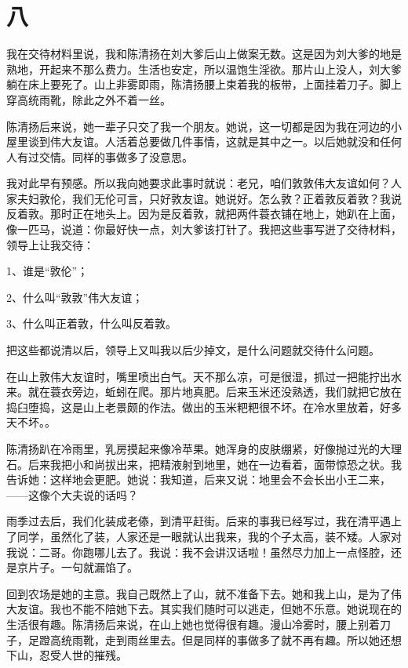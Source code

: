  

\section{八} 
 
我在交待材料里说，我和陈清扬在刘大爹后山上做案无数。这是因为刘大爹的地是熟地，开起来不那么费力。生活也安定，所以温饱生淫欲。那片山上没人，刘大爹躺在床上要死了。山上非雾即雨，陈清扬腰上束着我的板带，上面挂着刀子。脚上穿高统雨靴，除此之外不着一丝。 
 
 陈清扬后来说，她一辈子只交了我一个朋友。她说，这一切都是因为我在河边的小屋里谈到伟大友谊。人活着总要做几件事情，这就是其中之一。以后她就没和任何人有过交情。同样的事做多了没意思。 
 
 我对此早有预感。所以我向她要求此事时就说：老兄，咱们敦敦伟大友谊如何？人家夫妇敦伦，我们无伦可言，只好敦友谊。她说好。怎么敦？正着敦反着敦？我说反着敦。那时正在地头上。因为是反着敦，就把两件蓑衣铺在地上，她趴在上面，像一匹马，说道：你最好快一点，刘大爹该打针了。我把这些事写迸了交待材料，领导上让我交待： 
 
 1、谁是“敦伦”； 
 
 2、什么叫“敦敦”伟大友谊； 
 
 3、什么叫正着敦，什么叫反着敦。 
 
 把这些都说清以后，领导上又叫我以后少掉文，是什么问题就交待什么问题。 
 
 在山上敦伟大友谊时，嘴里喷出白气。天不那么凉，可是很湿，抓过一把能拧出水来。就在蓑衣旁边，蚯蚓在爬。那片地真肥。后来玉米还没熟透，我们就把它放在捣臼堕捣，这是山上老景颇的作法。做出的玉米粑粑很不坏。在冷水里放着，好多天不坏。。 
 
 陈清扬趴在冷雨里，乳房摸起来像冷苹果。她浑身的皮肤绷紧，好像抛过光的大理石。后来我把小和尚拔出来，把精液射到地里，她在一边看着，面带惊恐之状。我告诉她：这样地会更肥。她说：我知道，后来又说：地里会不会长出小王二来，——这像个大夫说的话吗？ 
 
 雨季过去后，我们化装成老傣，到清平赶街。后来的事我已经写过，我在清平遇上了同学，虽然化了装，人家还是一眼就认出我来，我的个子太高，装不矮。人家对我说：二哥。你跑哪儿去了。我说：我不会讲汉话啦！虽然尽力加上一点怪腔，还是京片子。一句就漏馅了。 
 
 回到农场是她的主意。我自己既然上了山，就不准备下去。她和我上山，是为了伟大友谊。我也不能不陪她下去。其实我们随时可以逃走，但她不乐意。她说现在的生活很有趣。陈清扬后来说，在山上她也觉得很有趣。漫山冷雾时，腰上别着刀子，足蹬高统雨靴，走到雨丝里去。但是同样的事做多了就不再有趣。所以她还想下山，忍受人世的摧残。 
 
